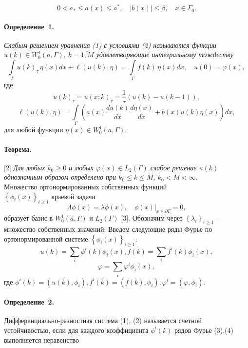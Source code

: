 \begin{equation*}{0<{{a}_{*}}\leqslant a(x)\leqslant{{a}^{*}},\quad|b(x)|\leqslant \beta,\quad x\in {{\Gamma }_{0}}.}\end{equation*} 

\paragraph{Определение~1.} {\it Слабым решением уравнения (1) с условиями (2) называются функции $ u(k)\in W_{0}^{1}(a,\Gamma ) $, $ k=\overline{1, M} $ удовлетворяющие интегральному тождеству} 
$$
	\int\limits_{\Gamma}u(k)_{\tau}\,\eta(x)dx+\ell(u(k),\eta)=
	\int\limits_{\Gamma}f(k)\,\eta(x) dx
	,\quad u(0)=\varphi(x),
$$
где $$ u(k)_{\tau}=u(x;k)_{\tau}=\frac{1}{\tau}(u(k)-u(k-1)),$$
$$\ell(u(k),\eta)=\int\limits_{\Gamma}\left(a(x)\frac{d u(k)}{d x}\frac{d \eta(x)}{d x}+b(x)u(k)\eta(x)\right)dx,$$
для любой функции $ \eta (x)\in W_{0}^{1}(a,\Gamma ) $.
\paragraph{Теорема.}[2] {\it Для любых $k_0\geqslant0$ и любых $\varphi(x)\in L_2(\Gamma)$ слабое решение $u(k)$ однозначным образом определено при $k_0\leqslant k\leqslant M$, $k_0<M<\infty$}.
\\

Множество ортонормированных собственных функций \\$\left\lbrace {\phi }_{i}(x) \right\rbrace_{i \geqslant 1}$ краевой задачи $$\Lambda \phi(x) =\lambda \phi(x),\quad \phi(x){{|}_{x\in \partial \Gamma }}=0,$$ образует базис в $W_{0}^{1}(a,\Gamma )$ и ${{L}_{2}}(\Gamma )$ [3]. Обозначим через $\left\lbrace \lambda_{i}\right\rbrace_{i \geqslant 1}$ -- множество собственных значений.
Введем следующие ряды Фурье по ортонормированной системе $\left\{\phi_{i}(x)\right\}_{i \geqslant 1}$:
\begin{equation}{
u(k)=\sum_{i}\phi^{i}(k) \phi_{i}(x), f(k)=\sum_{i} f^{i}(k) \phi_{i}(x)},\end{equation} 
\begin{equation}{
\varphi=\sum_{i} \varphi^{i} \phi_{i}(x),
}
\end{equation} 
где $\phi^{i}(k)=\left(u(k), \phi_{i}\right), f^{i}(k)=\left(f(k), \phi_{i}\right), \varphi^{i}=\left(\varphi, \phi_{i}\right)$.

\paragraph{Определение~2.}Дифференциально-разностная система (1), (2) называется счетной устойчивостью, если для каждого коэффициента $\phi^{i}(k) $ рядов Фурье (3),(4) выполняется неравенство


